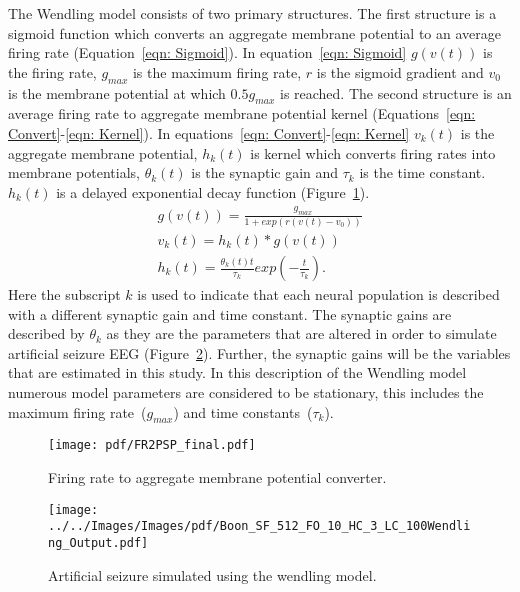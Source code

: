 The Wendling model consists of two primary structures. The first structure is a sigmoid function which converts an aggregate membrane potential to an average firing rate (Equation~\ref{eqn: Sigmoid}). In equation~\ref{eqn: Sigmoid} $g(v(t))$ is the firing rate, $g_{max}$ is the maximum firing rate, $r$ is the sigmoid gradient and $v_{0}$ is the membrane potential at which $0.5g_{max}$ is reached. The second structure is an average firing rate to aggregate membrane potential kernel (Equations~\ref{eqn: Convert}-\ref{eqn: Kernel}). In equations~\ref{eqn: Convert}-\ref{eqn: Kernel} $v_k(t)$ is the aggregate membrane potential, $h_{k}(t)$ is kernel which converts firing rates into membrane potentials, $\theta_{k}(t)$ is the synaptic gain and $\tau_{k}$ is the time constant. $h_{k}(t)$ is a delayed exponential decay function (Figure~\ref{fig: FR2PSP_final}).\begin{align}%
\label{eqn: Sigmoid}
g(v(t)) = \frac{g_{max}}{1+exp(r(v(t)-v_{0}))}\\
\label{eqn: Convert}
v_{k}(t) = h_{k}(t)*g(v(t))\\
\label{eqn: Kernel} 
h_{k}(t) = \frac{\theta_{k}(t)t}{\tau_{k}}exp\left(-\frac{t}{\tau_{k}}\right).
\end{align} Here the subscript $k$ is used to indicate that each neural population is described with a different synaptic gain and time constant. The synaptic gains are described by $\theta_{k}$ as they are the parameters that are altered in order to simulate artificial seizure EEG (Figure~\ref{fig: SeizureSim}). Further, the synaptic gains will be the variables that are estimated in this study. In this description of the Wendling model numerous model parameters are considered to be stationary, this includes the maximum firing rate~($g_{max}$) and time constants~($\tau_{k}$). 
\begin{figure}%
	\centering
		\texttt{[image: pdf/FR2PSP\_final.pdf]}
	\caption{Firing rate to aggregate membrane potential converter.}
	\label{fig: FR2PSP_final}
\end{figure} 
\begin{figure}%
	\centering
		\texttt{[image: ../../Images/Images/pdf/Boon\_SF\_512\_FO\_10\_HC\_3\_LC\_100Wendling\_Output.pdf]}
	\caption{Artificial seizure simulated using the wendling model.}
	\label{fig: SeizureSim}
\end{figure}
